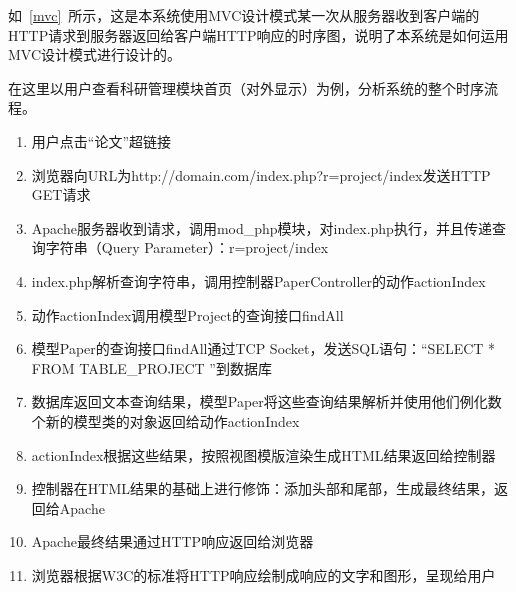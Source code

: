 如~\ref{mvc}~所示，这是本系统使用MVC设计模式某一次从服务器收到客户端的HTTP请求到服务器返回给客户端HTTP响应的时序图，说明了本系统是如何运用MVC设计模式进行设计的。

在这里以用户查看科研管理模块首页（对外显示）为例，分析系统的整个时序流程。
\begin{enumerate}
\item 用户点击“论文”超链接
\item 浏览器向URL为http://domain.com/index.php?r=project/index发送HTTP GET请求
\item Apache服务器收到请求，调用mod\_php模块，对index.php执行，并且传递查询字符串（Query Parameter）：r=project/index
\item index.php解析查询字符串，调用控制器PaperController的动作actionIndex
\item 动作actionIndex调用模型Project的查询接口findAll
\item 模型Paper的查询接口findAll通过TCP Socket，发送SQL语句：“SELECT * FROM TABLE\_PROJECT ”到数据库
\item 数据库返回文本查询结果，模型Paper将这些查询结果解析并使用他们例化数个新的模型类的对象返回给动作actionIndex
\item actionIndex根据这些结果，按照视图模版渲染生成HTML结果返回给控制器
\item 控制器在HTML结果的基础上进行修饰：添加头部和尾部，生成最终结果，返回给Apache
\item Apache最终结果通过HTTP响应返回给浏览器
\item 浏览器根据W3C的标准将HTTP响应绘制成响应的文字和图形，呈现给用户 
\end{enumerate}
